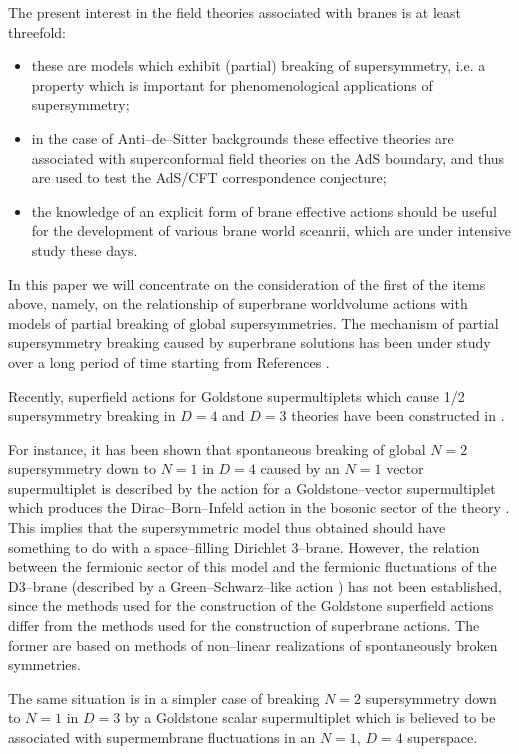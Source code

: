 \documentclass[a4paper,12pt]{article}
\begin{document}
The present interest in the field theories associated with branes
is at least threefold:
\begin{itemize}
\item
these are models which exhibit (partial) breaking of
supersymmetry, i.e. a property which is important for
phenomenological applications of supersymmetry;
\item
in the case of Anti--de--Sitter backgrounds these effective
theories are associated with superconformal field theories on the
AdS boundary, and thus are used to test the AdS/CFT correspondence
conjecture;
\item
the knowledge of an explicit form of brane effective actions
should be useful for the development of various brane world
sceanrii, which are under intensive study these days.
\end{itemize}

In this paper we will concentrate on the consideration of the
first of the items above, namely, on the relationship of
superbrane worldvolume actions with models of partial breaking of
global supersymmetries. The mechanism of partial supersymmetry
breaking caused by superbrane solutions has been under study over
a long period of time starting from References \cite{polch,achu}.

Recently, superfield actions for Goldstone supermultiplets which
cause 1/2 supersymmetry breaking in $D=4$ and $D=3$ theories have
been constructed in
\cite{bg2,rt,ik1}.

For instance, it has been shown \cite{bg2} that spontaneous
breaking of global $N=2$ supersymmetry down to $N=1$ in $D=4$
caused by an
$N=1$ vector supermultiplet is described by the action for a
Goldstone--vector supermultiplet which produces the
Dirac--Born--Infeld action in the bosonic sector of the theory
\cite{fer}. This implies that the supersymmetric model thus obtained
should have something to do with a space--filling Dirichlet
3--brane. However, the relation between the fermionic sector of
this model and the fermionic fluctuations of the D3--brane
(described by a Green--Schwarz--like action \cite{d3}) has not
been established, since the methods used for the construction of
the Goldstone superfield actions differ from the methods used for
the construction of superbrane actions. The former are based on
methods of non--linear realizations of spontaneously broken
symmetries.

The same situation is in a simpler case of breaking $N=2$
supersymmetry down to $N=1$ in $D=3$ by a Goldstone scalar
supermultiplet \cite{ik1} which is believed to be associated with
supermembrane fluctuations in an $N=1$, $D=4$ superspace.
\end{document}
